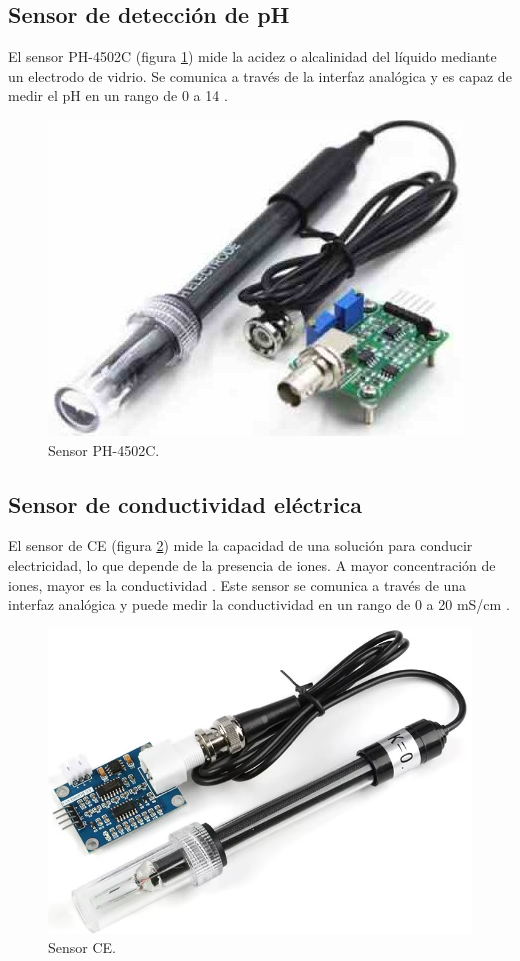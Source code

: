
\subsection{Sensor de detección de pH}

El sensor PH-4502C (figura \ref{fig:PH4502C}) mide la acidez o alcalinidad del
líquido mediante un electrodo de vidrio. Se comunica a través de la interfaz
analógica y es capaz de medir el pH en un rango de 0 a 14 \cite{PH-4502C}.

\begin{figure}[H]
	\centering
	\includegraphics[height=.15\textwidth]{./Images/7.png}
	\caption{Sensor PH-4502C\protect\footnotemark.}
	\label{fig:PH4502C}
\end{figure}


\subsection{Sensor de conductividad eléctrica}

El sensor de CE (figura \ref{fig:CE}) mide la capacidad de una solución para
conducir electricidad, lo que depende de la presencia de iones. A mayor
concentración de iones, mayor es la conductividad \cite{MTConductivitySensor}.
Este sensor se comunica a través de una interfaz analógica y puede medir la
conductividad en un rango de 0 a 20 mS/cm \cite{EC-Sensor}.

\begin{figure}[H]
	\centering
	\includegraphics[height=.15\textwidth]{./Images/8.png}
	\caption{Sensor CE\protect\footnotemark.}
	\label{fig:CE}
\end{figure}


